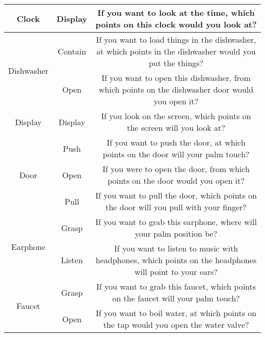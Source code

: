 \documentclass[final]{cvpr}
\begin{document}
\begin{table*}[t]
{\begin{tabular}{c|c|c}
    Clock                             & Display             & If you want to look at the time, which points on this clock would you look at?                                                                   \\ \hline
    \multirow{2}{*}{Dishwasher}       & Contain             & If you want to load things in the dishwasher, at which points in the dishwasher would you put the things?                                        \\
                                      & Open                & If you want to open this dishwasher, from which points on the dishwasher door would you open it?                                                 \\ \hline
    Display                           & Display             & If you look on the screen, which points on the screen will you look at?                                                                          \\ \hline
    \multirow{3}{*}{Door}             & Push                & If you want to push the door, at which points on the door will your palm touch?                                                                  \\
                                      & Open                & If you were to open the door, from which points on the door would you open it?                                                                   \\
                                      & Pull                & If you want to pull the door, which points on the door will you pull with your finger?                                                           \\ \hline
    \multirow{2}{*}{Earphone}         & Grasp               & If you want to grab this earphone, where will your palm position be?                                                                             \\
                                      & Listen              & If you want to listen to music with headphones, which points on the headphones will point to your ears?                                          \\ \hline
    \multirow{2}{*}{Faucet}           & Grasp               & If you want to grab this faucet, which points on the faucet will your palm touch?                                                                \\
                                      & Open                & If you want to boil water, at which points on the tap would you open the water valve?                                                            \\ \hline

\end{tabular}}
\end{table*}
\end{document}

